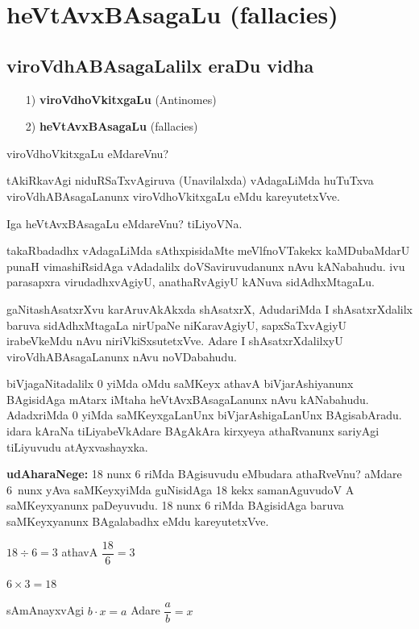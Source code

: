 \chapter{heVtAvxBAsagaLu {\rm (fallacies)}}
\vskip -20pt

\section*{viroVdhABAsagaLalilx eraDu vidha}

\begin{itemize}
\itemsep=0pt
\item[{\rm 1)}] {\bf viroVdhoVkitxgaLu} {\rm (Antinomes)}
\item[{\rm 2)}] {\bf heVtAvxBAsagaLu} {\rm (fallacies)}
\end{itemize}

viroVdhoVkitxgaLu eMdareVnu?

tAkiRkavAgi niduRSaTxvAgiruva (Unavilalxda) vAdagaLiMda huTuTxva viroVdhA\-BAsagaLanunx viroVdhoVkitxgaLu eMdu kareyutetxVve.

Iga heVtAvxBAsagaLu eMdareVnu? tiLiyoVNa.

takaRbadadhx vAdagaLiMda sAthxpisidaMte meVlfnoVTakekx kaMDubaMdarU punaH vimashiRsidAga vAdadalilx doVSaviruvudanunx nAvu kANabahudu. ivu parasapxra virudadhxvAgiyU, anathaRvAgiyU kANuva sidAdhxMtagaLu.

gaNitashAsatxrXvu karAruvAkAkxda shAsatxrX, AdudariMda I shAsatxrXdalilx baruva sidAdhxMta\-gaLa nirUpaNe niKaravAgiyU, sapxSaTxvAgiyU irabeVkeMdu nAvu niriVkiSxsutetxVve. Adare I shAsatxrXdalilxyU viroVdhABAsagaLanunx nAvu noVDabahudu.

biVjagaNitadalilx {\rm 0} yiMda oMdu saMKeyx athavA biVjarAshiyanunx BAgisidAga mAtarx iMtaha heVtAvxBAsagaLanunx nAvu kANabahudu. AdadxriMda {\rm 0} yiMda saMKeyx\-gaLanUnx biVjarAshigaLanUnx BAgisabAradu. idara kAraNa tiLiyabeVkAdare BAgAkAra kirxyeya athaRvanunx sariyAgi tiLiyuvudu atAyxvashayxka.

\textbf{udAharaNege:} {\rm 18} nunx {\rm 6} riMda BAgisuvudu eMbudara athaRveVnu? aMdare {\rm 6}~nunx yAva saMKeyxyiMda guNisidAga {\rm 18} kekx samanAguvudoV A saMKeyxyanunx paDeyuvudu. {\rm 18} nunx {\rm 6} riMda BAgisidAga baruva saMKeyxyanunx BAgalabadhx eMdu kareyutetxVve.
\begin{center}
$18\div 6=3$ \quad athavA \quad $\dfrac{18}{6}=3$

$6\times3=18$

sAmAnayxvAgi \quad $b\cdot x=a$ \quad Adare \quad $\dfrac{a}{b}=x$
\end{center}

